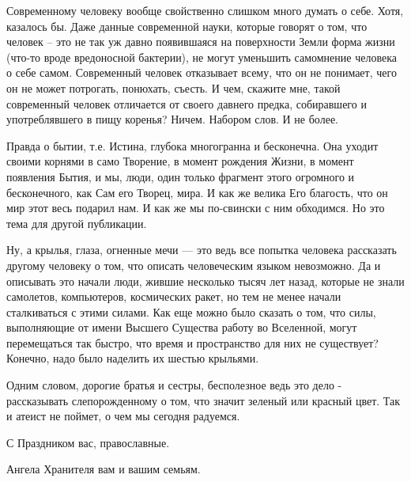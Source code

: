 Современному человеку вообще свойственно слишком много думать о себе. Хотя,
казалось бы. Даже данные современной науки, которые говорят о том, что человек
– это не так уж давно появившаяся на поверхности Земли форма жизни (что-то
вроде вредоносной бактерии), не могут уменьшить самомнение человека о себе
самом. Современный человек отказывает всему, что он не понимает, чего он не
может потрогать, понюхать, съесть. И чем, скажите мне, такой современный
человек отличается от своего давнего предка, собиравшего и употреблявшего в
пищу коренья? Ничем. Набором слов. И не более.

Правда о бытии, т.е. Истина, глубока многогранна и бесконечна. Она уходит
своими корнями в само Творение, в момент рождения Жизни, в момент появления
Бытия, и мы, люди, один только фрагмент этого огромного и бесконечного, как Сам
его Творец, мира. И как же велика Его благость, что он мир этот весь подарил
нам. И как же мы по-свински  с ним обходимся. Но это тема для другой
публикации.

Ну, а крылья, глаза, огненные мечи --- это ведь все попытка человека рассказать
другому человеку о том, что описать человеческим языком невозможно. Да и
описывать это начали люди, жившие несколько тысяч лет назад, которые не знали
самолетов, компьютеров, космических ракет, но тем не менее начали сталкиваться
с этими силами. Как еще можно было сказать о том, что силы, выполняющие от
имени Высшего Существа работу во Вселенной, могут перемещаться так быстро, что
время и пространство для них не существует? Конечно, надо было наделить их
шестью крыльями.

Одним словом, дорогие братья и сестры, бесполезное ведь это дело - рассказывать
слепорожденному о том, что значит зеленый или красный цвет. Так и атеист не
поймет, о чем мы сегодня радуемся.

С Праздником вас, православные.

Ангела Хранителя вам и вашим семьям.
